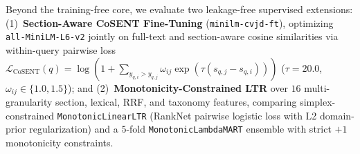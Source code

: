 Beyond the training-free core, we evaluate two leakage-free supervised extensions: (1)~\textbf{Section-Aware CoSENT Fine-Tuning} (\texttt{minilm-cvjd-ft}), optimizing \texttt{all-MiniLM-L6-v2} jointly on full-text and section-aware cosine similarities via within-query pairwise loss $\mathcal{L}_{\text{CoSENT}}(q) = \log(1 + \sum_{y_{q,i} > y_{q,j}} \omega_{ij} \exp(\tau(s_{q,j} - s_{q,i})))$ ($\tau = 20.0$, $\omega_{ij} \in \{1.0, 1.5\}$); and (2)~\textbf{Monotonicity-Constrained LTR} over $16$ multi-granularity section, lexical, RRF, and taxonomy features, comparing simplex-constrained \texttt{MonotonicLinearLTR} (RankNet pairwise logistic loss with L2 domain-prior regularization) and a $5$-fold \texttt{MonotonicLambdaMART} ensemble with strict $+1$ monotonicity constraints.

